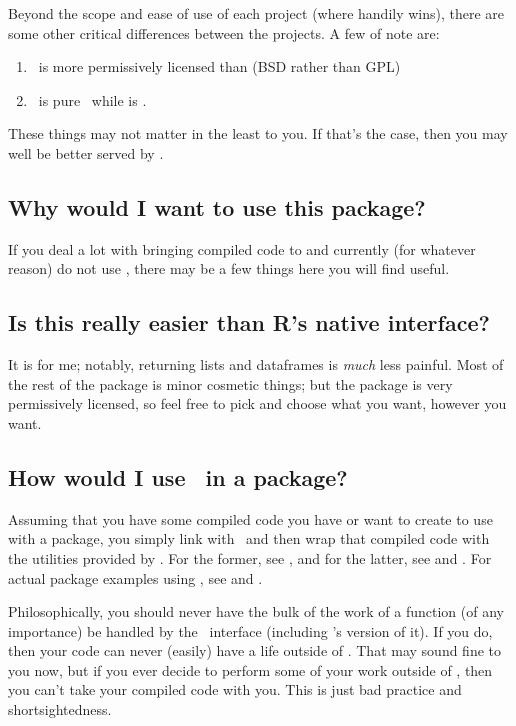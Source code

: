 Beyond the scope and ease of use of each project (where  handily wins), there are
some other critical differences between the projects.  A few of note are:

\begin{enumerate}
  \item \thispackage\ is more permissively licensed than  (BSD rather than GPL)
  \item \thispackage\ is pure \C\, while  is \Cpp.
\end{enumerate}

These things may not matter in the least to you.  If that's the case, then you
may well be better served by .


\subsection{Why would I want to use this package?}
If you deal a lot with bringing compiled code to \R and currently (for 
whatever reason) do not use , there may be a few things here you will 
find useful.


\subsection{Is this really easier than R's native interface?}
It is for me; notably, returning lists and dataframes is \emph{much} less 
painful.  Most of the rest of the package is minor cosmetic things; but the 
package is very permissively licensed, so feel free to pick and choose what you 
want, however you want.


\subsection{How would I use \thispackage\ in a package?}
Assuming that you have some compiled code you have or want to create to use with 
a package, you simply link with \thispackage\ and then wrap that compiled code 
with the utilities provided by \thispackage.  For the former, see 
, and for the latter, see  and 
.  For actual package examples using \thispackage, see 
\href{http://cran.r-project.org/web/packages/pbdBASE/index.html}{} 
and 
\href{http://cran.r-project.org/web/packages/pbdDMAT/index.html}{}.

Philosophically, you should never have the bulk of the work of a function (of any
importance) be handled by the \R\ interface (including \thispackage's version of it).
If you do, then your code can never (easily) have a life outside of \R.  That may sound fine to you
now, but if you ever decide to perform some of your work outside of \R, then you can't take
your compiled code with you.  This is just bad practice and shortsightedness.  



